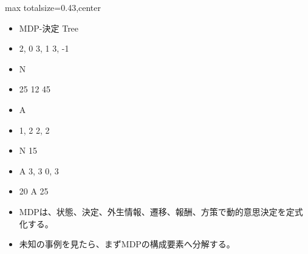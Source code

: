 \clearpage
{}
\begin{minipage}[t]{0.405\textwidth}
\begin{adjustbox}{max totalsize={\textwidth}{0.43\textheight},center}
\begin{minipage}{\textwidth}\scriptsize
{}\begin{itemize}
\item MDP-決定 Tree
\item 2, 0 3, 1 3, -1
\item N
\item 25 12 45
\item A
\item 1, 2 2, 2
\item N 15
\item A 3, 3 0, 3
\item 20 A 25
\end{itemize}\begin{itemize}
\item MDPは、状態、決定、外生情報、遷移、報酬、方策で動的意思決定を定式化する。
\item 未知の事例を見たら、まずMDPの構成要素へ分解する。
\end{itemize}
\end{minipage}
\end{adjustbox}
\end{minipage}\hfill
